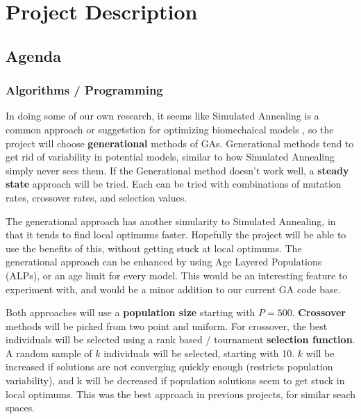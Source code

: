 
\section{Project Description}

\subsection{Agenda}

\subsubsection{Algorithms / Programming}
In doing some of our own research, it seems like Simulated Annealing is a common
approach or suggetstion for optimizing biomechaical models \cite{mcgowan} 
\cite{thelen} \cite{lloyd}, so the project will 
choose \textbf{generational} methods of GAs. Generational methods tend to get 
rid of variability in potential models, similar to how Simulated Annealing 
simply never sees them. If the Generational method doesn't work well, a 
\textbf{steady state} approach will be tried. Each can be tried with 
combinations of mutation rates, crossover rates, and selection values.

The generational approach has another simularity to Simulated Annealing, in 
that it tends to find local optimums faster. Hopefully the project will be
able to use the benefits of this, without getting stuck at local optimums. 
The generational approach can be enhanced by using Age Layered Populations
(ALPs), or an age limit for every model. This would be an interesting 
feature to experiment with, and would be a minor addition to our current
GA code base.

Both approaches will use a \textbf{population size} starting with $ P = 500 $. 
\textbf{Crossover} methods will be picked from two point and uniform. 
For crossover, the best individuals will be selected using a rank based / 
tournament \textbf{selection function}. A random sample of $ k $ individuals
will be selected, starting with 10. $ k $ will be increased if solutions are
not converging quickly enough (restricts population variability), and k will be
decreased if population solutions seem to get stuck in local optimums. This
was the best approach in previous projects, for similar seach spaces.

